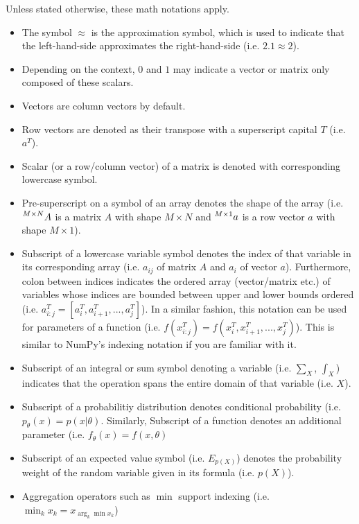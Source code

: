 \documentclass{article}
\numberwithin{equation}{subsection}
\begin{document}
Unless stated otherwise, these math notations apply. 
\begin{itemize}
    \item The symbol $\approx$ is the approximation symbol, which is used to indicate that the left-hand-side approximates the right-hand-side (i.e. $2.1 \approx 2$).
    \item Depending on the context, $0$ and $1$ may indicate a vector or matrix only composed of these scalars.
    \item Vectors are column vectors by default.
    \item Row vectors are denoted as their transpose with a superscript capital $T$ (i.e. $a^T$).
    \item Scalar (or a row/column vector) of a matrix is denoted with corresponding lowercase symbol.
    \item Pre-superscript on a symbol of an array denotes the shape of the array (i.e. $\prescript{M\times N}{}{A}$ is a matrix $A$ with shape $M\times N$ and $\prescript{M\times 1}{}{a}$ is a row vector $a$ with shape $M\times 1$).
    \item Subscript of a lowercase variable symbol denotes the index of that variable in its corresponding array (i.e. $a_{ij}$ of matrix $A$ and $a_i$ of vector $a$). Furthermore, colon between indices indicates the ordered array (vector/matrix etc.) of variables whose indices are bounded between upper and lower bounds ordered (i.e. $a^T_{i:j} = [a^T_i, a^T_{i+1}, ..., a^T_j]$). In a similar fashion, this notation can be used for parameters of a function (i.e. $f(x^T_{i:j}) = f(x^T_i, x^T_{i+1}, ..., x^T_j)$). This is similar to NumPy's indexing notation if you are familiar with it.
    \item Subscript of an integral or sum symbol denoting a variable (i.e. $\sum_X$, $\int_X$) indicates that the operation spans the entire domain of that variable (i.e. $X$).
    \item Subscript of a probabilitiy distribution denotes conditional probability (i.e. $p_\theta(x) = p(x|\theta)$. Similarly, Subscript of a function denotes an additional parameter (i.e. $f_\theta(x) = f(x, \theta)$
    \item Subscript of an expected value symbol (i.e. $E_{p(X)}$) denotes the probability weight of the random variable given in its formula (i.e. $p(X)$).
    \item Aggregation operators such as $\min$ support indexing (i.e. $\min_kx_k = x_{\arg_k\min x_k}$)
\end{itemize}
\end{document}
